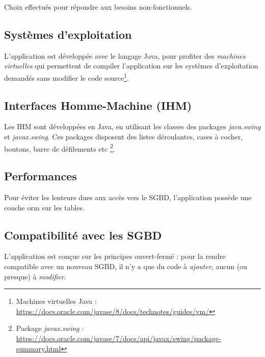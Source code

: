 Choix effectués pour répondre aux besoins non-fonctionnels.

\subsection{Systèmes d'exploitation}
L'application est développée avec le langage Java, pour profiter des \textit{machines virtuelles} qui permettent de compiler l'application sur les systèmes d'exploitation demandés sans modifier le code source\footnote{\label{les_machines_virtuelles}Machines virtuelles Java : \url{https://docs.oracle.com/javase/8/docs/technotes/guides/vm/}}.

\subsection{Interfaces Homme-Machine (IHM)}
Les IHM sont développées en Java, en utilisant les classes des packages \textit{java.swing} et \textit{javax.swing}. Ces packages disposent des listes déroulantes, cases à cocher, boutons, barre de défilements etc
\footnote{\label{element_de_formulaire}Package \textit{javax.swing} : \url{https://docs.oracle.com/javase/7/docs/api/javax/swing/package-summary.html}}.

\subsection{Performances}
Pour éviter les lenteurs dues aux accès vers le SGBD, l'application possède une couche \gls{orm} sur les tables.

\subsection{Compatibilité avec les SGBD}
L'application est conçue sur les principes ouvert-fermé : pour la rendre compatible avec un nouveau SGBD, il n'y a que du code à \textit{ajouter}, aucun (ou presque) à \textit{modifier}.
